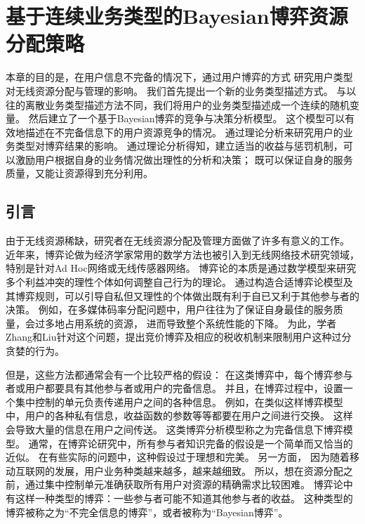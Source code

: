 \graphicspath{ {../body/bayesian_figures/}}
\chapter{基于连续业务类型的Bayesian博弈资源分配策略}
\par 
本章的目的是，在用户信息不完备的情况下，通过用户博弈的方式
研究用户类型对无线资源分配与管理的影响。
我们首先提出一个新的业务类型描述方式。
与以往的离散业务类型描述方法不同，我们将用户的业务类型描述成一个连续的随机变量。
然后建立了一个基于Bayesian博弈的竞争与决策分析模型。
这个模型可以有效地描述在不完备信息下的用户资源竞争的情况。
通过理论分析来研究用户的业务类型对博弈结果的影响。
通过理论分析得知，建立适当的收益与惩罚机制，可以激励用户根据自身的业务情况做出理性的分析和决策；
既可以保证自身的服务质量，又能让资源得到充分利用。
%
\section{引言}
由于无线资源稀缺，研究者在无线资源分配及管理方面做了许多有意义的工作。
近年来，博弈论做为经济学家常用的数学方法也被引入到无线网络技术研究领域，
特别是针对Ad Hoc网络或无线传感器网络\cite{Srivastava:2005}\cite{FangBensaou2004}。
博弈论的本质是通过数学模型来研究多个利益冲突的理性个体如何调整自己行为的理论。
通过构造合适博弈论模型及其博弈规则，可以引导自私但又理性的个体做出既有利于自已又利于其他参与者的决策。
例如，在多媒体码率分配问题中，用户往往为了保证自身最佳的服务质量，会过多地占用系统的资源，
进而导致整个系统性能的下降。
为此，学者Zhang和Liu针对这个问题，提出竞价博弈及相应的税收机制来限制用户这种过分贪婪的行为\cite{ZhangLiu2011}。

但是，这些方法都通常会有一个比较严格的假设：
在这类博弈中，每个博弈参与者或用户都要具有其他参与者或用户的完备信息。
并且，在博弈过程中，设置一个集中控制的单元负责传递用户之间的各种信息。
例如，在类似这样博弈模型中，用户的各种私有信息，收益函数的参数等等都要在用户之间进行交换。
这样会导致大量的信息在用户之间传送。
这类博弈分析模型称之为完备信息下博弈模型。
通常，在博弈论研究中，所有参与者知识完备的假设是一个简单而又恰当的近似。
在有些实际的问题中，这种假设过于理想和完美。
另一方面，
因为随着移动互联网的发展，用户业务种类越来越多，越来越细致。
所以，想在资源分配之前，通过集中控制单元准确获取所有用户对资源的精确需求比较困难。
博弈论中有这样一种类型的博弈：一些参与者可能不知道其他参与者的收益。
这种类型的博弈被称之为“不完全信息的博弈”，或者被称为“Bayesian博弈”。

